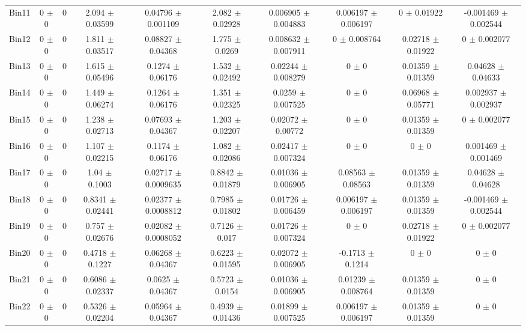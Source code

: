 \begin{tabular}{@{\extracolsep{4pt}}lccccccccc@{}}
     Bin11 & 0 $\pm$ 0 & 0 & 2.094 $\pm$ 0.03599 & 0.04796 $\pm$ 0.001109 & 2.082 $\pm$ 0.02928 & 0.006905 $\pm$ 0.004883 & 0.006197 $\pm$ 0.006197 & 0 $\pm$ 0.01922 & -0.001469 $\pm$ 0.002544 \\ 
     Bin12 & 0 $\pm$ 0 & 0 & 1.811 $\pm$ 0.03517 & 0.08827 $\pm$ 0.04368 & 1.775 $\pm$ 0.0269 & 0.008632 $\pm$ 0.007911 & 0 $\pm$ 0.008764 & 0.02718 $\pm$ 0.01922 & 0 $\pm$ 0.002077 \\ 
     Bin13 & 0 $\pm$ 0 & 0 & 1.615 $\pm$ 0.05496 & 0.1274 $\pm$ 0.06176 & 1.532 $\pm$ 0.02492 & 0.02244 $\pm$ 0.008279 & 0 $\pm$ 0 & 0.01359 $\pm$ 0.01359 & 0.04628 $\pm$ 0.04633 \\ 
     Bin14 & 0 $\pm$ 0 & 0 & 1.449 $\pm$ 0.06274 & 0.1264 $\pm$ 0.06176 & 1.351 $\pm$ 0.02325 & 0.0259 $\pm$ 0.007525 & 0 $\pm$ 0 & 0.06968 $\pm$ 0.05771 & 0.002937 $\pm$ 0.002937 \\ 
     Bin15 & 0 $\pm$ 0 & 0 & 1.238 $\pm$ 0.02713 & 0.07693 $\pm$ 0.04367 & 1.203 $\pm$ 0.02207 & 0.02072 $\pm$ 0.00772 & 0 $\pm$ 0 & 0.01359 $\pm$ 0.01359 & 0 $\pm$ 0.002077 \\ 
     Bin16 & 0 $\pm$ 0 & 0 & 1.107 $\pm$ 0.02215 & 0.1174 $\pm$ 0.06176 & 1.082 $\pm$ 0.02086 & 0.02417 $\pm$ 0.007324 & 0 $\pm$ 0 & 0 $\pm$ 0 & 0.001469 $\pm$ 0.001469 \\ 
     Bin17 & 0 $\pm$ 0 & 0 & 1.04 $\pm$ 0.1003 & 0.02717 $\pm$ 0.0009635 & 0.8842 $\pm$ 0.01879 & 0.01036 $\pm$ 0.006905 & 0.08563 $\pm$ 0.08563 & 0.01359 $\pm$ 0.01359 & 0.04628 $\pm$ 0.04628 \\ 
     Bin18 & 0 $\pm$ 0 & 0 & 0.8341 $\pm$ 0.02441 & 0.02377 $\pm$ 0.0008812 & 0.7985 $\pm$ 0.01802 & 0.01726 $\pm$ 0.006459 & 0.006197 $\pm$ 0.006197 & 0.01359 $\pm$ 0.01359 & -0.001469 $\pm$ 0.002544 \\ 
     Bin19 & 0 $\pm$ 0 & 0 & 0.757 $\pm$ 0.02676 & 0.02082 $\pm$ 0.0008052 & 0.7126 $\pm$ 0.017 & 0.01726 $\pm$ 0.007324 & 0 $\pm$ 0 & 0.02718 $\pm$ 0.01922 & 0 $\pm$ 0.002077 \\ 
     Bin20 & 0 $\pm$ 0 & 0 & 0.4718 $\pm$ 0.1227 & 0.06268 $\pm$ 0.04367 & 0.6223 $\pm$ 0.01595 & 0.02072 $\pm$ 0.006905 & -0.1713 $\pm$ 0.1214 & 0 $\pm$ 0 & 0 $\pm$ 0 \\ 
     Bin21 & 0 $\pm$ 0 & 0 & 0.6086 $\pm$ 0.02337 & 0.0625 $\pm$ 0.04367 & 0.5723 $\pm$ 0.0154 & 0.01036 $\pm$ 0.006905 & 0.01239 $\pm$ 0.008764 & 0.01359 $\pm$ 0.01359 & 0 $\pm$ 0 \\ 
     Bin22 & 0 $\pm$ 0 & 0 & 0.5326 $\pm$ 0.02204 & 0.05964 $\pm$ 0.04367 & 0.4939 $\pm$ 0.01436 & 0.01899 $\pm$ 0.007525 & 0.006197 $\pm$ 0.006197 & 0.01359 $\pm$ 0.01359 & 0 $\pm$ 0 \\ 

\end{tabular}
